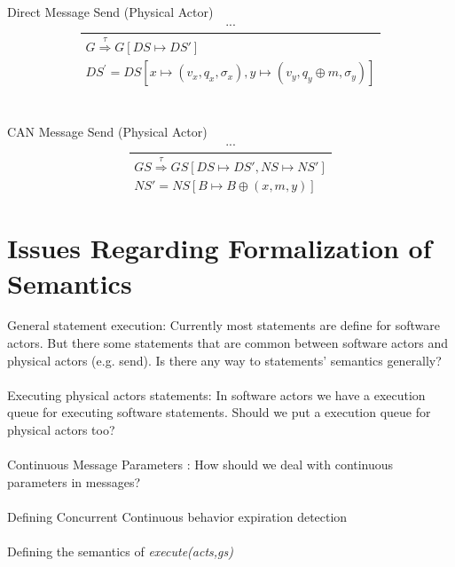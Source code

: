 \documentclass[]{article}
\begin{document}
\\\\
Direct Message Send (Physical Actor)
\begin{equation}
\frac
{
	\begin{gathered}
	...
	\end{gathered}
}
{
	\begin{gathered}
	G\overset{\tau}{\Rightarrow}G[DS\longmapsto DS'] \\
	DS^{'}=DS[x \longmapsto(v_x,q_x,\sigma_x),y\longmapsto(v_y,q_y \oplus m,\sigma_y) ]
	\end{gathered}
}
\end{equation}
\\\\
CAN Message Send (Physical Actor)
\begin{equation}
\frac
{
	\begin{gathered}
	...
	\end{gathered}
}
{
	\begin{gathered}
	GS\overset{\tau}{\Rightarrow}GS[DS\longmapsto DS', NS\longmapsto NS'] \\
	NS' = NS[B\longmapsto B \oplus (x,m,y)]
	\end{gathered}
}
\end{equation}

\section{Issues Regarding Formalization of Semantics}
General statement execution: Currently most statements are define for software actors. But there some statements that are common between software actors and physical actors (e.g. send). Is there any way to statements' semantics generally? \\ \\
Executing physical actors statements: In software actors we have a execution queue for executing software statements. Should we put a execution queue for physical actors too?\\ \\
Continuous Message Parameters : How should we deal with continuous parameters in messages? \\ \\
Defining  Concurrent Continuous behavior expiration detection \\ \\
Defining the semantics of \textit{execute(acts,gs)} \\\\
\end{document}
